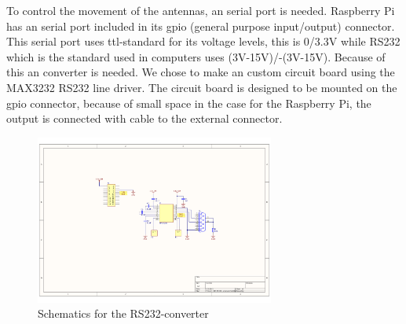 To control the movement of the antennas, an serial port is needed. Raspberry Pi has an serial port included in its gpio (general purpose input/output) connector. This serial port uses ttl-standard for its voltage levels, this is 0/3.3V while RS232 which is the standard used in computers uses (3V-15V)/-(3V-15V). Because of this an converter is needed. We chose to make an custom circuit board using the MAX3232 RS232 line driver. The circuit board is designed to be mounted on the gpio connector, because of small space in the case for the Raspberry Pi, the output is connected with cable to the external connector.

\begin{figure}
	\begin{center}
		\includegraphics[width=0.7\textwidth, trim=360 220 190 180, clip=true]{../Schematics/RPI-RS232-schematic.pdf}
	\end{center}
	\caption{Schematics for the RS232-converter}
	\label{fig:UART-RS232}
\end{figure}